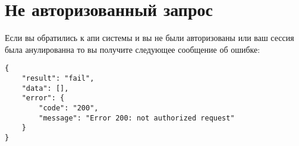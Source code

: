 \section{Не авторизованный запрос}
\par
Если вы обратились к апи системы
и вы не были авторизованы или ваш сессия была анулированна то
вы получите следующее сообщение об ошибке:
\begin{Verbatim}[frame=single]
{
    "result": "fail",
    "data": [],
    "error": {
        "code": "200",
        "message": "Error 200: not authorized request"
    }
}
\end{Verbatim}